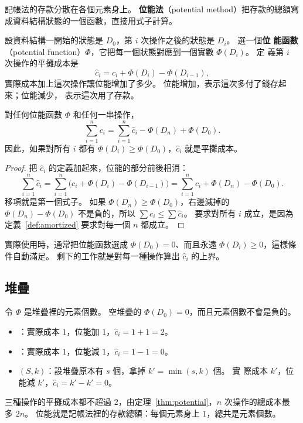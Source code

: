 記帳法的存款分散在各個元素身上。 \textbf{位能法}（potential method）把存款的總額寫
成資料結構狀態的一個函數，直接用式子計算。

設資料結構一開始的狀態是 $D_0$，第 $i$ 次操作之後的狀態是 $D_i$。 選一個\textbf{位
能函數}（potential function）$\Phi$，它把每一個狀態對應到一個實數 $\Phi(D_i)$。 定
義第 $i$ 次操作的平攤成本是
\[
\hat{c}_i = c_i + \Phi(D_i) - \Phi(D_{i-1}),
\]
實際成本加上這次操作讓位能增加了多少。 位能增加，表示這次多付了錢存起來；位能減少，
表示這次用了存款。

\begin{theorem}
\label{thm:potential}
對任何位能函數 $\Phi$ 和任何一串操作，
\[
\sum_{i=1}^{n} c_i = \sum_{i=1}^{n} \hat{c}_i - \Phi(D_n) + \Phi(D_0).
\]
因此，如果對所有 $i$ 都有 $\Phi(D_i) \ge \Phi(D_0)$，$\hat{c}_i$ 就是平攤成本。
\end{theorem}

\begin{proof}
把 $\hat{c}_i$ 的定義加起來，位能的部分前後相消：
\[
\sum_{i=1}^{n} \hat{c}_i = \sum_{i=1}^{n} \bigl( c_i + \Phi(D_i) - \Phi(D_{i-1}) \bigr)
= \sum_{i=1}^{n} c_i + \Phi(D_n) - \Phi(D_0).
\]
移項就是第一個式子。 如果 $\Phi(D_n) \ge \Phi(D_0)$，右邊減掉的
$\Phi(D_n) - \Phi(D_0)$ 不是負的，所以 $\sum c_i \le \sum \hat{c}_i$。 要求對所有
$i$ 成立，是因為定義~\ref{def:amortized} 要求對每一個 $n$ 都成立。
\end{proof}

實際使用時，通常把位能函數選成 $\Phi(D_0) = 0$、而且永遠 $\Phi(D_i) \ge 0$，這樣條
件自動滿足。 剩下的工作就是對每一種操作算出 $\hat{c}_i$ 的上界。

\subsection{堆疊}

令 $\Phi$ 是堆疊裡的元素個數。 空堆疊的 $\Phi(D_0) = 0$，而且元素個數不會是負的。

\begin{itemize}
\item {}：實際成本 $1$，位能加 $1$，$\hat{c}_i = 1 + 1 = 2$。
\item {}：實際成本 $1$，位能減 $1$，$\hat{c}_i = 1 - 1 = 0$。
\item {}$(S, k)$：設堆疊原本有 $s$ 個，拿掉 $k' = \min(s, k)$ 個。 實
際成本 $k'$，位能減 $k'$，$\hat{c}_i = k' - k' = 0$。
\end{itemize}

三種操作的平攤成本都不超過 $2$，由定理~\ref{thm:potential}，$n$ 次操作的總成本最
多 $2n$。 位能就是記帳法裡的存款總額：每個元素身上 $1$，總共是元素個數。

